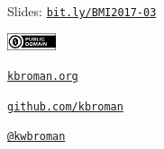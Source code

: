 \documentclass[12pt,t]{beamer}
\begin{document}
\begin{frame}[c]{}

\large

\vspace*{10mm}
Slides: \href{http://bit.ly/BMI2017-03}{\tt bit.ly/BMI2017-03}

\vspace*{-5mm}
\hspace{90mm} \includegraphics[height=5mm]{Figs/cc-zero.png}

\vspace{2mm}

\href{http://kbroman.org}{\tt kbroman.org}

\vspace{2mm}

\href{https://github.com/kbroman}{\tt github.com/kbroman}

\vspace{2mm}

\href{https://twitter.com/kwbroman}{\tt @kwbroman}


\end{frame}
\end{document}
